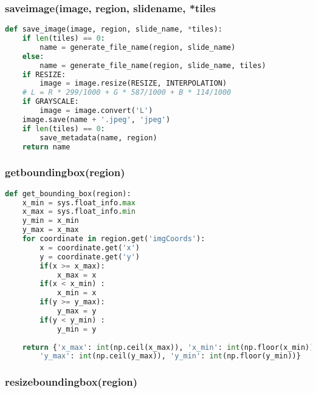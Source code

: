 \subsubsection{save{\textunderscore}image(image, region, slide{\textunderscore}name, *tiles}

\begin{lstlisting}[frame=single,language=python]
def save_image(image, region, slide_name, *tiles):
	if len(tiles) == 0:
		name = generate_file_name(region, slide_name)
	else:
		name = generate_file_name(region, slide_name, tiles)
	if RESIZE:
		image = image.resize(RESIZE, INTERPOLATION)
	# L = R * 299/1000 + G * 587/1000 + B * 114/1000
	if GRAYSCALE:
		image = image.convert('L')
	image.save(name + '.jpeg', 'jpeg')
	if len(tiles) == 0:
		save_metadata(name, region)
	return name
\end{lstlisting}


\subsubsection{get{\textunderscore}bounding{\textunderscore}box(region)}

\begin{lstlisting}[frame=single,language=python]
def get_bounding_box(region):
	x_min = sys.float_info.max
	x_max = sys.float_info.min
	y_min = x_min
	y_max = x_max
	for coordinate in region.get('imgCoords'):
		x = coordinate.get('x')
		y = coordinate.get('y')
		if(x >= x_max):
			x_max = x
		if(x < x_min) :
			x_min = x
		if(y >= y_max):
			y_max = y
		if(y < y_min) :
			y_min = y
	
	return {'x_max': int(np.ceil(x_max)), 'x_min': int(np.floor(x_min)),
		'y_max': int(np.ceil(y_max)), 'y_min': int(np.floor(y_min))}
\end{lstlisting}


\subsubsection{resize{\textunderscore}bounding{\textunderscore}box(region)}


